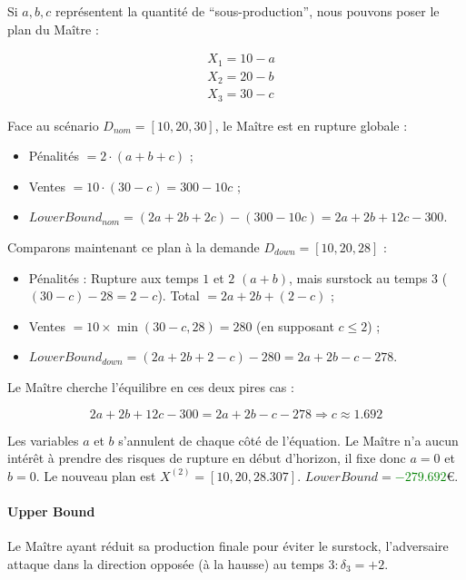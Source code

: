 \documentclass[11pt,a4paper]{article}
\begin{document}
    Si $a, b, c$ représentent la quantité de \enquote{sous-production}, nous pouvons poser le plan du Maître :
    
    \begin{align}
        &X_1=10-a\\
        &X_2=20-b\\
        &X_3=30-c
    \end{align}
    
    Face au scénario $D_{nom}=[10, 20, 30]$, le Maître est en rupture globale :
    
    \begin{itemize}
        \item Pénalités $=2\cdot(a+b+c)$ ;
        \item Ventes $=10\cdot(30-c)=300-10c$ ;
        \item $LowerBound_{nom}=(2a+2b+2c)-(300-10c)=2a+2b+12c-300$.
    \end{itemize}
    
    Comparons maintenant ce plan à la demande $D_{down}=[10, 20, 28]$ :
    
    \begin{itemize}
        \item Pénalités : Rupture aux temps $1$ et $2$ $(a+b)$, mais surstock au temps $3$ ($(30-c)-28=2-c$). Total $=2a+2b+(2-c)$ ;
        \item Ventes $=10\times\min(30-c, 28)=280$ (en supposant $c\leq2$) ;
        \item $LowerBound_{down}=(2a+2b+2-c)-280=2a+2b-c-278$.
    \end{itemize}
    
    Le Maître cherche l'équilibre en ces deux pires cas :
    
    \[
        2a+2b+12c-300=2a+2b-c-278 \Longrightarrow c \approx 1.692
    \]
    
    Les variables $a$ et $b$ s'annulent de chaque côté de l'équation. Le Maître n'a aucun intérêt à prendre des risques de rupture en début d'horizon, il fixe donc $a=0$ et $b=0$. Le nouveau plan est $X^{(2)}=[10, 20, 28.307]$. $LowerBound=$\textcolor{green}{$-279.692$}\euro.
    
    \paragraph{Upper Bound} Le Maître ayant réduit sa production finale pour éviter le surstock, l'adversaire attaque dans la direction opposée (à la hausse) au temps $3 : \delta_3=+2$.
    
\end{document}
